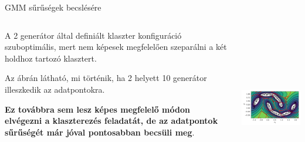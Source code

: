 \documentclass[english, aspectratio=169]{beamer}
\begin{document}
\begin{frame}{GMM sűrűségek becslésére}
\begin{columns}
\begin{column}{.5\textwidth}
A 2 generátor által definiált klaszter konfiguráció szuboptimális, mert nem képesek megfelelően szeparálni a két holdhoz tartozó klasztert.\par\smallskip
Az ábrán látható, mi történik, ha 2 helyett 10 generátor illeszkedik az adatpontokra.\par\smallskip
\textbf{Ez továbbra sem lesz képes megfelelő módon elvégezni a klaszterezés feladatát, de az adatpontok sűrűségét már jóval pontosabban becsüli meg}. 
\end{column}
\begin{column}{.5\textwidth}
\begin{center}
\includegraphics[width=7cm, height=7cm, keepaspectratio]{images/generative_26.png}
\end{center}
\end{column}
\end{columns}
\end{frame}
\end{document}
